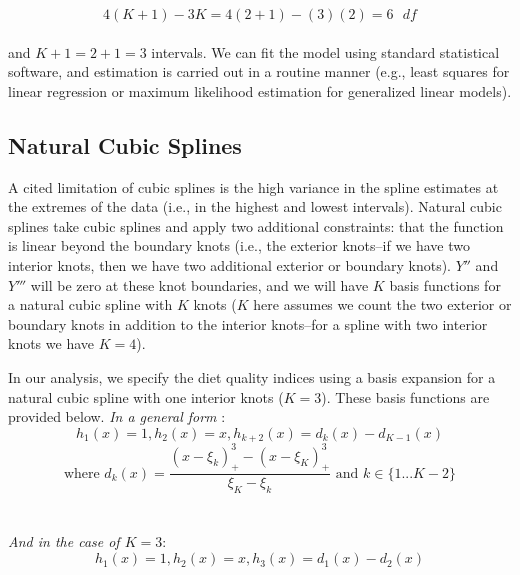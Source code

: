 \documentclass{article}
\begin{document}
$$4(K+1)-3K=4(2+1)-(3)(2)=6\text{ }{df}$$
\\
\noindent and $K+1=2+1=3$ intervals. We can fit the model using standard statistical software, and estimation is carried out in a routine manner (e.g., least squares for linear regression or maximum likelihood estimation for generalized linear models).

\vspace{0.5cm} %
\subsection{Natural Cubic Splines}
\hspace{\parindent} A cited limitation of cubic splines is the high variance in the spline estimates at the extremes of the data (i.e., in the highest and lowest intervals). \supercite{hastie_elements_2009} Natural cubic splines take cubic splines and apply two additional constraints: that the function is linear beyond the boundary knots (i.e., the exterior knots--if we have two interior knots, then we have two additional exterior or boundary knots). $Y''$ and $Y'''$ will be zero at these knot boundaries, and we will have $K$ basis functions for a natural cubic spline with $K$ knots ($K$ here assumes we count the two exterior or boundary knots in addition to the interior knots--for a spline with two interior knots we have $K=4$). 

\hspace{\parindent} In our analysis, we specify the diet quality indices using a basis expansion for a natural cubic spline with one interior knots ($K=3$). These basis functions are provided below.
\newline
\newline
\textit{In a general form}\supercite{hastie_elements_2009} :
\\
$$h_1(x)=1,h_2(x)=x, h_{k+2}(x)=d_k(x)-d_{K-1}(x)$$
$$\text{where } d_k(x)=\frac{(x-\xi_k)^3_+-(x-\xi_K)^3_+}{\xi_K-\xi_k} \text{ and } k\in\{1...K-2\}$$
\\
\\
\textit{And in the case of $K=3$}:
$$h_1(x)=1, h_2(x)=x, h_{3}(x)=d_1(x)-d_{2}(x)$$
\\
\\
\end{document}
